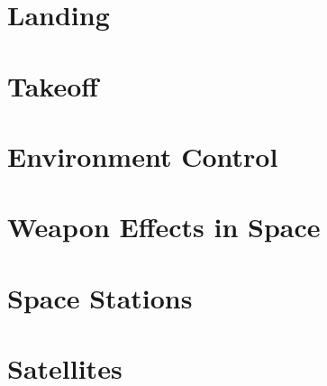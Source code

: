 \section{Landing}
\section{Takeoff}
\section{Environment Control}
\section{Weapon Effects in Space}
\section{Space Stations}
\section{Satellites}


